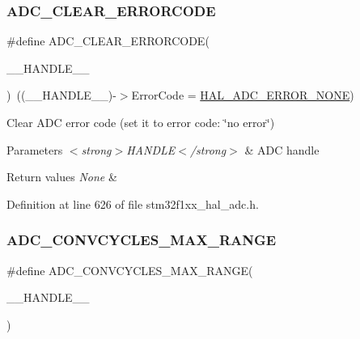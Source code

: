 \subsubsection{\texorpdfstring{A\+D\+C\+\_\+\+C\+L\+E\+A\+R\+\_\+\+E\+R\+R\+O\+R\+C\+O\+DE}{ADC\_CLEAR\_ERRORCODE}}
{\footnotesize\ttfamily \#define A\+D\+C\+\_\+\+C\+L\+E\+A\+R\+\_\+\+E\+R\+R\+O\+R\+C\+O\+DE(\begin{DoxyParamCaption}\item[{}]{\+\_\+\+\_\+\+H\+A\+N\+D\+L\+E\+\_\+\+\_\+ }\end{DoxyParamCaption})~((\+\_\+\+\_\+\+H\+A\+N\+D\+L\+E\+\_\+\+\_\+)-\/$>$Error\+Code = \hyperlink{group___a_d_c___error___code_ga93b4576d46ee0f8c53b7d69f39778e38}{H\+A\+L\+\_\+\+A\+D\+C\+\_\+\+E\+R\+R\+O\+R\+\_\+\+N\+O\+NE})}



Clear A\+DC error code (set it to error code\+: \char`\"{}no error\char`\"{}) 


\begin{DoxyParams}{Parameters}
{\em $<$strong$>$\+H\+A\+N\+D\+L\+E$<$/strong$>$} & A\+DC handle \\
\hline
\end{DoxyParams}

\begin{DoxyRetVals}{Return values}
{\em None} & \\
\hline
\end{DoxyRetVals}


Definition at line 626 of file stm32f1xx\+\_\+hal\+\_\+adc.\+h.

\mbox{\label{group___a_d_c___private___macros_ga649e53d6a9a5716d9dce4d58904a3884}} 
\subsubsection{\texorpdfstring{A\+D\+C\+\_\+\+C\+O\+N\+V\+C\+Y\+C\+L\+E\+S\+\_\+\+M\+A\+X\+\_\+\+R\+A\+N\+GE}{ADC\_CONVCYCLES\_MAX\_RANGE}}
{\footnotesize\ttfamily \#define A\+D\+C\+\_\+\+C\+O\+N\+V\+C\+Y\+C\+L\+E\+S\+\_\+\+M\+A\+X\+\_\+\+R\+A\+N\+GE(\begin{DoxyParamCaption}\item[{}]{\+\_\+\+\_\+\+H\+A\+N\+D\+L\+E\+\_\+\+\_\+ }\end{DoxyParamCaption})}

